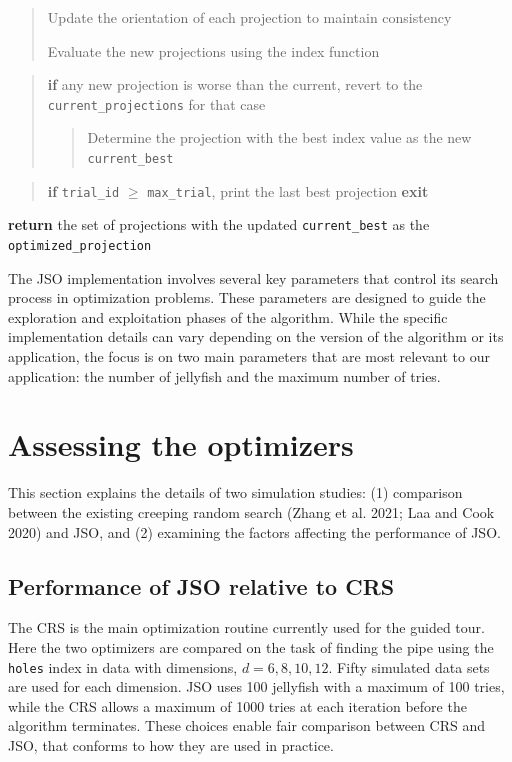 \documentclass[
  12pt,
]{interact}
\theoremstyle{plain}
\begin{document}
\begin{tcolorbox}
\begin{quote}
Update the orientation of each projection to maintain consistency

Evaluate the new projections using the index function
\end{quote}

\begin{quote}
\textbf{if} any new projection is worse than the current, revert to the
\texttt{current\_projections} for that case

\begin{quote}
Determine the projection with the best index value as the new
\texttt{current\_best}
\end{quote}
\end{quote}

\begin{quote}
\textbf{if} \texttt{trial\_id} \(\ge\) \texttt{max\_trial}, print the
last best projection \textbf{exit}
\end{quote}

\textbf{return} the set of projections with the updated
\texttt{current\_best} as the \texttt{optimized\_projection}

\end{tcolorbox}

The JSO implementation involves several key parameters that control its
search process in optimization problems. These parameters are designed
to guide the exploration and exploitation phases of the algorithm. While
the specific implementation details can vary depending on the version of
the algorithm or its application, the focus is on two main parameters
that are most relevant to our application: the number of jellyfish and
the maximum number of tries.

\section{Assessing the optimizers}\label{sec-sim-deets}

This section explains the details of two simulation studies: (1)
comparison between the existing creeping random search (Zhang et al.
2021; Laa and Cook 2020) and JSO, and (2) examining the factors
affecting the performance of JSO.

\subsection{Performance of JSO relative to CRS}\label{sec-app-1}

The CRS is the main optimization routine currently used for the guided
tour. Here the two optimizers are compared on the task of finding the
pipe using the \texttt{holes} index in data with dimensions,
\(d = 6, 8, 10, 12\). Fifty simulated data sets are used for each
dimension. JSO uses 100 jellyfish with a maximum of 100 tries, while the
CRS allows a maximum of 1000 tries at each iteration before the
algorithm terminates. These choices enable fair comparison between CRS
and JSO, that conforms to how they are used in practice.
\end{document}
